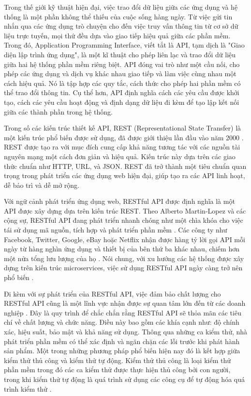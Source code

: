 Trong thế giới kỹ thuật hiện đại, việc trao đổi dữ liệu giữa các ứng dụng và hệ thống là một phần không thể thiếu của cuộc sống hàng ngày. Từ việc gửi tin nhắn qua các ứng dụng trò chuyện cho đến việc truy vấn thông tin từ cơ sở dữ liệu trực tuyến, mọi thứ đều dựa vào giao tiếp hiệu quả giữa các phần mềm.
Trong đó, Application Programming Interface, viết tắt là API, tạm dịch là "Giao diện lập trình ứng dụng", là một kĩ thuật cho phép liên lạc và trao đổi dữ liệu giữa hai hệ thống phần mềm riêng biệt. API đóng vai trò như một cầu nối, cho phép các ứng dụng và dịch vụ khác nhau giao tiếp và làm việc cùng nhau một cách hiệu quả. Nó là tập hợp các quy tắc, cách thức cho phép hai phần mềm có thể trao đổi thông tin. Cụ thể hơn, API định nghĩa cách các yêu cầu được khởi tạo, cách các yêu cầu hoạt động và định dạng dữ liệu đi kèm để tạo lập kết nối giữa các thành phần trong hệ thống.

Trong số các kiến trúc thiết kế API, REST (Representational State Transfer) là một kiến trúc phổ biến được sử dụng, đã được giới thiệu lần đầu vào năm 2000 \cite{RESTAPI}. REST được tạo ra với mục đích cung cấp khả năng tương tác với các nguồn tài nguyên mạng một cách đơn giản và hiệu quả. Kiến trúc này dựa trên các giao thức chuẩn như HTTP, URL, và JSON. REST đã trở thành một tiêu chuẩn quan trọng trong phát triển các ứng dụng web hiện đại, giúp tạo ra các API linh hoạt, dễ bảo trì và dễ mở rộng.

Với ngữ cảnh phát triển ứng dụng web, RESTful API được định nghĩa là một API được xây dựng dựa trên kiến trúc REST. Theo Alberto Martin-Lopez và các cộng sự, RESTful API đang phát triển nhanh chóng như một chìa khóa cho việc tái sử dụng mã nguồn, tích hợp và phát triển phần mềm \cite{9700203}. Các công ty như Facebook, Twitter, Google, eBay hoặc Netflix nhận được hàng tỷ lời gọi API mỗi ngày từ hàng nghìn ứng dụng và thiết bị của bên thứ ba khác nhau, chiếm hơn một nửa tổng lưu lượng của họ \cite{jacobson2012apis}. Nói chung, với xu hướng các hệ thống được xây dựng trên kiến trúc microservices, việc sử dụng RESTful API ngày càng trở nên phổ biến \cite{8385157}.

Đi kèm với sự phát triển của
 RESTful API, việc đảm bảo chất lượng cho RESTful API cũng là một lĩnh vực nhận được sự quan tâm lớn đến từ các doanh nghiệp \cite{app12094369}. Đây là quy trình để chắc chắn rằng RESTful API sẽ thỏa mãn các tiêu chí về chất lượng và chức năng. Điều này bao gồm các khía cạnh như: độ chính xác, hiệu suất, bảo mật và khả năng sử dụng. Thông qua những ca kiểm thử, nhà phát triển phần mềm có thể xác định và ngăn chặn các lỗi trước khi phát hành sản phẩm. Một trong những phương pháp phổ biến hiện nay đó là kết hợp giữa kiểm thử thủ công và kiểm thử tự động. Kiểm thử thủ công là loại kiểm thử phần mềm trong đó các ca kiểm thử được thực hiện thủ công bởi con người, trong khi kiểm thử tự động là quá trình sử dụng các công cụ để tự động hóa quá trình kiểm thử \cite{9034254}.


